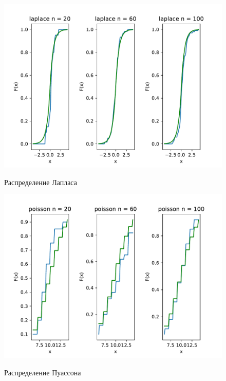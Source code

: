 \documentclass[a4paper]{article}
\begin{document}
\begin{figure}[H]
	\centering
	{\includegraphics[scale=0.5]{src_lab_4/emperical_fun_laplace}}
		\caption{Распределение Лапласа}
		\label{fig:laplace}
	\end{figure}

\begin{figure}[H]
	\centering
	{\includegraphics[scale=0.5]{src_lab_4/emperical_fun_poisson}}
		\caption{Распределение Пуассона}
		\label{fig:posson}
	\end{figure}
\end{document}
